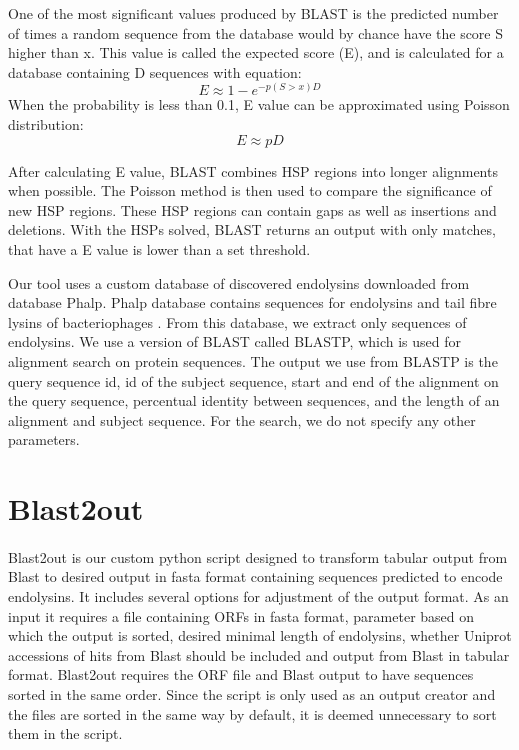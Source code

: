 One of the most significant values produced by BLAST is the predicted number of times a random sequence from the database would by chance have the score S higher than x. This value is called the expected score (E), and is calculated for a database containing D sequences with equation:
\[ E \approx 1 - e^{-p(S>x) D} \]
When the probability is less than 0.1, E value can be approximated using Poisson distribution:
\[ E \approx p D \]

After calculating E value, BLAST combines HSP regions into longer alignments when possible. The Poisson method is then used to compare the significance of new HSP regions. These HSP regions can contain gaps as well as insertions and deletions. With the HSPs solved, BLAST returns an output with only matches, that have a E value is lower than a set threshold.

Our tool uses a custom database of discovered endolysins downloaded from database Phalp. Phalp database contains sequences for endolysins and tail fibre lysins of bacteriophages \cite{criel2021phalp}. From this database, we extract only sequences of endolysins. We use a version of BLAST called BLASTP, which is used for alignment search on protein sequences. The output we use from BLASTP is the query sequence id, id of the subject sequence, start and end of the alignment on the query sequence, percentual identity between sequences, and the length of an alignment and subject sequence. For the search, we do not specify any other parameters.

\section{Blast2out}
\paragraph*{}
Blast2out is our custom python script designed to transform tabular output from Blast to desired output in fasta format containing sequences predicted to encode endolysins. It includes several options for adjustment of the output format. As an input it requires a file containing ORFs in fasta format, parameter based on which the output is sorted, desired minimal length of endolysins, whether Uniprot accessions of hits from Blast should be included and output from Blast in tabular format. Blast2out requires the ORF file and Blast output to have sequences sorted in the same order. Since the script is only used as an output creator and the files are sorted in the same way by default, it is deemed unnecessary to sort them in the script. 

